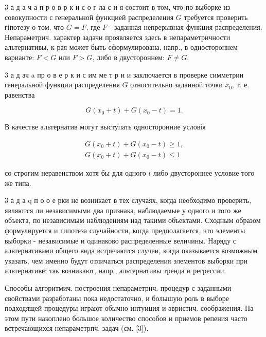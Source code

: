 \documentclass[10pt]{article}
\begin{document}
3 а д а ч а п р о в р к и с о г ла с и я состоит в том, что по выборке из совокупности с генеральной функцией распределения $G$ требуется проверить гіпотезу о том, что $G=F$, где $F$ - заданная непрерывная функция распределения. Непараметрич. характер задачи проявляется здесь в непараметричности альтернативы, к-рая может быть сформулирована, напр., в одностороннем варианте: $F<G$ или $F>G$, либо в двустороннем: $F \neq G$.



3 а д ач a пр о в е р к и с им ме т р и и заключается в проверке симметрии генеральной функции распределения $G$ относительно заданной точки $x_{0}$, т. е. равенства



\[

G\left(x_{0}+t\right)+G\left(x_{0}-t\right)=1 .

\]



В качестве альтернатив могут выступать односторонние условія



\[

\begin{gathered}

G\left(x_{0}+t\right)+G\left(x_{0}-t\right) \geqslant 1, \\

G\left(x_{0}+t\right)+G\left(x_{0}-t\right) \leqslant 1

\end{gathered}

\]



со строгим неравенством хотя бы для одного $t$ либо двустороннее условие того же типа.



3 а д а q п о о е рки не возникает в тех случаях, когда необходимо проверить, являются ли независимыми два признака, наблюдаемые у одного и того же объекта, по независимым наблюдениям над такими объектами. Сходным образом формулируется и гипотеза случайности, когда предполагается, что элементы выборки - независимые и одинаково распределенные величины. Наряду с альтернативами общего вида встречаются случаи, когда оказывается возможным указать, чем именно будут отличаться распределения элементов выборки при альтернативе; так возникают, напр., альтернативы тренда и регрессии.



Способы алгоритмич. построения непараметрич. процедур с заданными свойствами разработаны пока недостаточно, и болышую роль в выборе подходящей процедуры играют обычно интуиция и әвристич. соображения. На этом пути накоплено большое количество способов и приемов репения часто встречающихся непараметрпч. задач (см. [3]).
\end{document}
